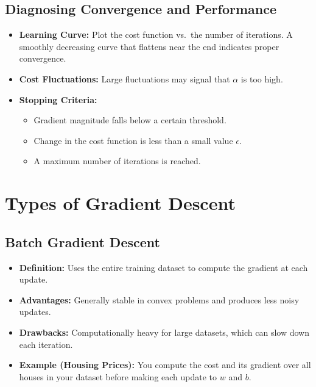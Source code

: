 \documentclass{article}
\begin{document}
\subsection{Diagnosing Convergence and Performance}

\begin{itemize}
    \item \textbf{Learning Curve:} Plot the cost function vs.\ the number of iterations. A smoothly decreasing curve that flattens near the end indicates proper convergence.
    \item \textbf{Cost Fluctuations:} Large fluctuations may signal that \(\alpha\) is too high.
    \item \textbf{Stopping Criteria:}
    \begin{itemize}[label=\(\bullet\)]
        \item Gradient magnitude falls below a certain threshold.
        \item Change in the cost function is less than a small value \(\epsilon\).
        \item A maximum number of iterations is reached.
    \end{itemize}
\end{itemize}

\section{Types of Gradient Descent}

\subsection{Batch Gradient Descent}
\begin{itemize}
    \item \textbf{Definition:} Uses the entire training dataset to compute the gradient at each update.
    \item \textbf{Advantages:} Generally stable in convex problems and produces less noisy updates.
    \item \textbf{Drawbacks:} Computationally heavy for large datasets, which can slow down each iteration.
    \item \textbf{Example (Housing Prices):} You compute the cost and its gradient over all houses in your dataset before making each update to \(w\) and \(b\).
\end{itemize}
\end{document}
